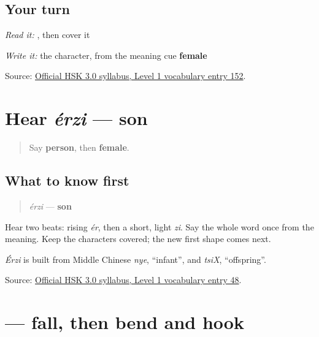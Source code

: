 \subsection*{Your turn}
\emph{Read it:} \textbf{}, then cover it

\emph{Write it:} the character, from the meaning cue \textbf{female}

\begin{tcolorbox}[breakable,colback=teal!4,colframe=teal!35!black,title={Before you move on}]
Source: \href{https://hsk.cn-bj.ufileos.com/3.0/\%E6\%96\%B0\%E7\%89\%88HSK\%E8\%80\%83\%E8\%AF\%95\%E5\%A4\%A7\%E7\%BA\%B21219.pdf}{Official HSK 3.0 syllabus, Level 1 vocabulary entry 152}.
\end{tcolorbox}
\section[érzi]{Hear \emph{érzi} — son}

\label{lesson:ZH-C12-hear-erzi}



\begin{quote}
Say \textbf{person}, then \textbf{female}.
\end{quote}

\subsection*{What to know first}
\begin{quote}
\emph{érzi} — \textbf{son}
\end{quote}

Hear two beats: rising \emph{ér}, then a short, light \emph{zi}. Say the whole word once from the meaning. Keep the characters covered; the new first shape comes next.

\emph{Érzi} is built from Middle Chinese \emph{nye}, \textquotedblleft{}infant\textquotedblright{}, and \emph{tsiX}, \textquotedblleft{}offspring\textquotedblright{}.

\begin{tcolorbox}[breakable,colback=teal!4,colframe=teal!35!black,title={Before you move on}]
Source: \href{https://hsk.cn-bj.ufileos.com/3.0/\%E6\%96\%B0\%E7\%89\%88HSK\%E8\%80\%83\%E8\%AF\%95\%E5\%A4\%A7\%E7\%BA\%B21219.pdf}{Official HSK 3.0 syllabus, Level 1 vocabulary entry 48}.
\end{tcolorbox}
\section[\texorpdfstring{\zh{儿} (ér)}{儿 (ér)}]{ — fall, then bend and hook}

